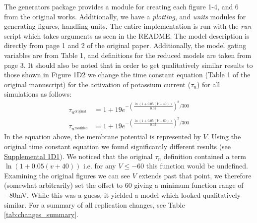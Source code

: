 The generators package provides a module for creating each figure 1-4, and 6 from the original works. Additionally, we have a \emph{plotting}, and \emph{units} modules for generating figures, handling units. The entire implementation is run with the \emph{run} script which takes arguments as seen in the README. The model description is directly from page 1 and 2 of the original paper. Additionally, the model gating variables are from Table 1, and definitions for the reduced models are taken from page 3. It should also be noted that in order to get qualitatively similar results to those shown in Figure 1D2 we change the time constant equation (Table 1 of the original manuscript) for the activation of potassium current ($\tau_n$) for all simulations as follows:
%
\begin{align}
  \tau_{n^\text{original}} &= 1 + 19 e^{- \left(\frac{\ln\left(1 + 0.05 (V+40)\right)}{0.05}\right)^{2}/300}\\
  \tau_{n^\text{modified}} &= 1 + 19 e^{- \left(\frac{\ln\left(1 + 0.05 (V+60)\right)}{0.05}\right)^{2}/300}
\end{align}
%
In the equation above, the membrane potential is represented by $V$. Using the original time constant equation we found significantly different results (see \href{https://github.com/mupsh/ReScience\_Qian\_2014/blob/master/figures/figure\_supp\_1D1.pdf}{Supplemental 1D1}). We noticed that the original $\tau_n$ definition contained a term $\ln\left(1 + 0.05 (v+40)\right)$ i.e. for any $V\leq-60$ this function would be undefined. Examining the original figures we can see $V$ extends past that point, we therefore (somewhat arbitrarily) set the offset to 60 giving a minimum function range of $-80$mV. While this was a guess, it yielded a model which looked qualitatively similar. 
For a summary of all replication changes, see Table \ref{tab:changes_summary}. 

